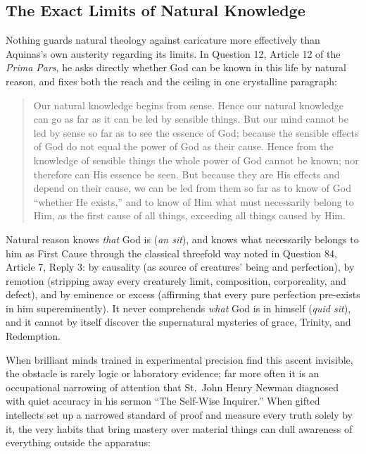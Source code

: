 \subsection{The Exact Limits of Natural Knowledge}

Nothing guards natural theology against caricature more effectively than Aquinas's own austerity regarding its limits. In Question 12, Article 12 of the \emph{Prima Pars}, he asks directly whether God can be known in this life by natural reason, and fixes both the reach and the ceiling in one crystalline paragraph:

\begin{quote}
Our natural knowledge begins from sense. Hence our natural knowledge can go as far as it can be led by sensible things. But our mind cannot be led by sense so far as to see the essence of God; because the sensible effects of God do not equal the power of God as their cause. Hence from the knowledge of sensible things the whole power of God cannot be known; nor therefore can His essence be seen. But because they are His effects and depend on their cause, we can be led from them so far as to know of God ``whether He exists,'' and to know of Him what must necessarily belong to Him, as the first cause of all things, exceeding all things caused by Him.
\end{quote}

Natural reason knows \emph{that} God is (\emph{an sit}), and knows what necessarily belongs to him as First Cause through the classical threefold way noted in Question 84, Article 7, Reply 3: by causality (as source of creatures' being and perfection), by remotion (stripping away every creaturely limit, composition, corporeality, and defect), and by eminence or excess (affirming that every pure perfection pre-exists in him supereminently). It never comprehends \emph{what} God is in himself (\emph{quid sit}), and it cannot by itself discover the supernatural mysteries of grace, Trinity, and Redemption.

When brilliant minds trained in experimental precision find this ascent invisible, the obstacle is rarely logic or laboratory evidence; far more often it is an occupational narrowing of attention that St.\ John Henry Newman diagnosed with quiet accuracy in his sermon ``The Self-Wise Inquirer.'' When gifted intellects set up a narrowed standard of proof and measure every truth solely by it, the very habits that bring mastery over material things can dull awareness of everything outside the apparatus:


